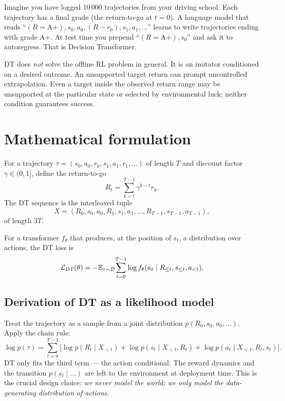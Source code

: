 \documentclass[11pt,oneside]{scrbook}
\begin{document}
\begin{intuition}
Imagine you have logged 10\,000 trajectories from your driving school. Each trajectory has a final grade (the return-to-go at $t=0$). A language model that reads ``$(R = \text{A+}), s_0, a_0, (R - r_0), s_1, a_1, \ldots$'' learns to write trajectories ending with grade A+. At test time you prepend ``$(R = \text{A+}), s_0$'' and ask it to autoregress. That is Decision Transformer.
\end{intuition}

\begin{pitfall}
DT does \emph{not} solve the offline RL problem in general. It is an imitator conditioned on a desired outcome. An unsupported target return can prompt uncontrolled extrapolation. Even a target inside the observed return range may be unsupported at the particular state or selected by environmental luck; neither condition guarantees success.
\end{pitfall}

\chapter{Mathematical formulation}

\begin{definition}
For a trajectory $\tau = (s_0, a_0, r_0, s_1, a_1, r_1, \ldots)$ of length $T$ and discount factor $\gamma \in (0,1]$, define the return-to-go
\[
  R_t = \sum_{k=t}^{T-1} \gamma^{k-t} r_k.
\]
The DT sequence is the interleaved tuple
\[
  X = (R_0, s_0, a_0, R_1, s_1, a_1, \ldots, R_{T-1}, s_{T-1}, a_{T-1}),
\]
of length $3T$.
\end{definition}

\begin{definition}[DT objective]
For a transformer $f_\theta$ that produces, at the position of $s_t$, a distribution over actions, the DT loss is
\[
  \mathcal{L}_{\mathrm{DT}}(\theta) = -\mathbb{E}_{\tau \sim \mathcal{D}} \!\sum_{t=0}^{T-1} \log f_\theta(a_t \mid R_{\le t}, s_{\le t}, a_{<t}).
\]
\end{definition}

\section{Derivation of DT as a likelihood model}

Treat the trajectory as a sample from a joint distribution $p(R_0, s_0, a_0, \ldots)$. Apply the chain rule:
\[
  \log p(\tau) = \sum_{t=0}^{T-1} \bigl[\log p(R_t \mid X_{<t}) + \log p(s_t \mid X_{<t}, R_t) + \log p(a_t \mid X_{<t}, R_t, s_t)\bigr].
\]
DT only fits the third term --- the action conditional. The reward dynamics and the transition $p(s_t \mid \ldots)$ are left to the environment at deployment time. This is the crucial design choice: \emph{we never model the world; we only model the data-generating distribution of actions}.
\end{document}
